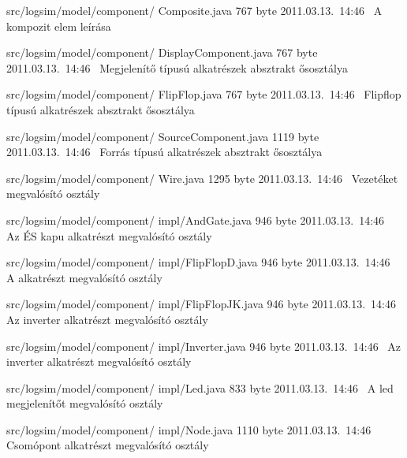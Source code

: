 \begin{fajllista}
\fajl
{src/logsim/model/component/\newline
Composite.java} %
{767 byte} %
{2011.03.13.~14:46~} %
{A kompozit elem leírása} %

\fajl
{src/logsim/model/component/\newline
DisplayComponent.java} %
{767 byte} %
{2011.03.13.~14:46~} %
{Megjelenítő típusú alkatrészek absztrakt ősosztálya} %

\fajl
{src/logsim/model/component/\newline
FlipFlop.java} %
{767 byte} %
{2011.03.13.~14:46~} %
{Flipflop típusú alkatrészek absztrakt ősosztálya} %

\fajl
{src/logsim/model/component/\newline
SourceComponent.java} %
{1119 byte} %
{2011.03.13.~14:46~} %
{Forrás típusú alkatrészek absztrakt ősosztálya} %

\fajl
{src/logsim/model/component/\newline
Wire.java} %
{1295 byte} %
{2011.03.13.~14:46~} %
{Vezetéket megvalósító osztály} %

\fajl
{src/logsim/model/component/\newline
impl/AndGate.java} %
{946 byte} %
{2011.03.13.~14:46~} %
{Az ÉS kapu alkatrészt megvalósító osztály} %

\fajl
{src/logsim/model/component/\newline
impl/FlipFlopD.java} %
{946 byte} %
{2011.03.13.~14:46~} %
{A alkatrészt megvalósító osztály} %

\fajl
{src/logsim/model/component/\newline
impl/FlipFlopJK.java} %
{946 byte} %
{2011.03.13.~14:46~} %
{Az inverter alkatrészt megvalósító osztály} %

\fajl
{src/logsim/model/component/\newline
impl/Inverter.java} %
{946 byte} %
{2011.03.13.~14:46~} %
{Az inverter alkatrészt megvalósító osztály} %

\fajl
{src/logsim/model/component/\newline
impl/Led.java} %
{833 byte} %
{2011.03.13.~14:46~} %
{A led megjelenítőt megvalósító osztály} %

\fajl
{src/logsim/model/component/\newline
impl/Node.java} %
{1110 byte} %
{2011.03.13.~14:46~} %
{Csomópont alkatrészt megvalósító osztály} %


\end{fajllista}
